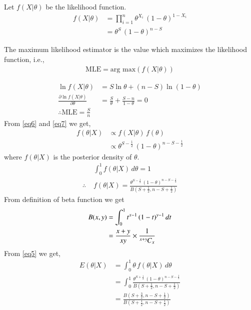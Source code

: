 \documentclass[journal,12pt,twocolumn]{IEEEtran}
\begin{document}
Let $f(X|\theta)$ be the likelihood function.
\begin{align}
    f(X|\theta) &= \prod_{i=1}^n\theta^{X_i}\,(1-\theta)^{1-X_i}\nonumber\\ 
    &=\theta^S\,(1-\theta)^{n-S}\label{eq7}
\end{align}
\begin{definition}
The maximum likelihood estimator is the value which maximizes the likelihood function, i.e.,
\begin{align}
    \text{MLE} = \text{arg max}(f(X|\theta))
\end{align}
\end{definition}

\begin{align}
    \ln{f(X|\theta)} &= S\ln{\theta} + (n-S)\ln{(1-\theta)}\\
    \frac{\partial \ln{f(X|\theta)}}{\partial \theta} &= \frac{S}{\theta} + \frac{S-n}{1-\theta} = 0 \nonumber\\
     \therefore \text{MLE} = \frac{S}{n}
\end{align}
From \eqref{eq6} and \eqref{eq7} we get,
\begin{align}
    f(\theta|X) &\propto f(X|\theta)\, f(\theta)\nonumber\\
    &\propto \theta^{S-\frac{1}{2}}\,(1-\theta)^{n-S-\frac{1}{2}}
\end{align}
where $f(\theta|X)$ is the posterior density of $\theta$.
\begin{align}
    &\int_0^1 f(\theta|X)\,d\theta = 1\nonumber\\
    \therefore\; &f(\theta|X) = \frac{\theta^{S-\frac{1}{2}}\,(1-\theta)^{n-S-\frac{1}{2}}}{B(S+\frac{1}{2},n-S+\frac{1}{2})}
\end{align}
From definition of beta function we get
\begin{align}
    B(x,y) &= \int_0^1 t^{x-1}\,(1-t)^{y-1}\,dt\nonumber\\
    &= \frac{x+y}{xy}\times \frac{1}{{{}^{x+y}\mkern-1muC_{x}}}\label{eq1}
\end{align}
From \eqref{eq5} we get,
\begin{align}
    E(\theta|X) &= \int_0^1 \theta\,f(\theta|X)\,d\theta\nonumber\\
    &=\int_0^1 \frac{\theta^{S+\frac{1}{2}}\,(1-\theta)^{n-S-\frac{1}{2}}}{B(S+\frac{1}{2},n-S+\frac{1}{2})}\nonumber\\
    &=\frac{B(S+\frac{3}{2},n-S+\frac{1}{2})}{B(S+\frac{1}{2},n-S+\frac{1}{2})}\label{eq2}
\end{align}
\end{document}
